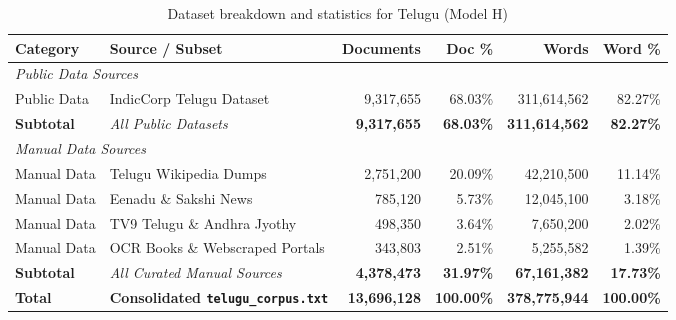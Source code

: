 \documentclass[8pt]{article}
\begin{document}
\begin{table}[!htp]
    \centering
    \footnotesize %
    \setlength{\tabcolsep}{3.5pt} %
    \begin{tabular}{llrrrr}
        \toprule
        \textbf{Category} & \textbf{Source / Subset} & \textbf{Documents} & \textbf{Doc \%} & \textbf{Words} & \textbf{Word \%} \\
        \midrule
        \multicolumn{6}{l}{\textit{Public Data Sources}} \\
        Public Data & IndicCorp Telugu Dataset & 9,317,655 & 68.03\% & 311,614,562 & 82.27\% \\
        \midrule
        \textbf{Subtotal} & \textit{All Public Datasets} & \textbf{9,317,655} & \textbf{68.03\%} & \textbf{311,614,562} & \textbf{82.27\%} \\
        \midrule
        \multicolumn{6}{l}{\textit{Manual Data Sources}} \\
        Manual Data & Telugu Wikipedia Dumps & 2,751,200 & 20.09\% & 42,210,500 & 11.14\% \\
        Manual Data & Eenadu \& Sakshi News & 785,120 & 5.73\% & 12,045,100 & 3.18\% \\
        Manual Data & TV9 Telugu \& Andhra Jyothy & 498,350 & 3.64\% & 7,650,200 & 2.02\% \\
        Manual Data & OCR Books \& Webscraped Portals & 343,803 & 2.51\% & 5,255,582 & 1.39\% \\
        \midrule
        \textbf{Subtotal} & \textit{All Curated Manual Sources} & \textbf{4,378,473} & \textbf{31.97\%} & \textbf{67,161,382} & \textbf{17.73\%} \\
        \midrule
        \textbf{Total} & \textbf{Consolidated \texttt{telugu\_corpus.txt}} & \textbf{13,696,128} & \textbf{100.00\%} & \textbf{378,775,944} & \textbf{100.00\%} \\
        \bottomrule
    \end{tabular}
    \caption{Dataset breakdown and statistics for Telugu (Model H)}
    \label{tab:telugu_stats}
\end{table}
\end{document}
